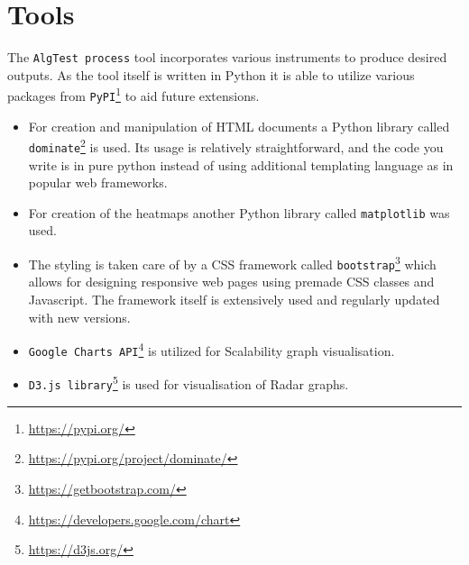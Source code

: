 \section{Tools}\label{sec:tools}
The \texttt{AlgTest process} tool incorporates various instruments to produce desired outputs. As the tool itself is written in Python it is able to utilize various packages from \texttt{PyPI}\footnote{\url{https://pypi.org/}} to aid future extensions.

\begin{itemize}
    \item For creation and manipulation of HTML documents a Python library called \texttt{dominate}\footnote{\url{https://pypi.org/project/dominate/}} is used. Its usage is relatively straightforward, and the code you write is in pure python instead of using additional templating language as in popular web frameworks.
    \item For creation of the heatmaps another Python library called \texttt{matplotlib} was used.
    \item The styling is taken care of by a CSS framework called \texttt{bootstrap}\footnote{\url{https://getbootstrap.com/}} which allows for designing responsive web pages using premade CSS classes and Javascript. The framework itself is extensively used and regularly updated with new versions.
    \item \texttt{Google Charts API}\footnote{\url{https://developers.google.com/chart}}  is utilized for Scalability graph visualisation.
    \item \texttt{D3.js library}\footnote{\url{https://d3js.org/}}  is used for visualisation of Radar graphs.
\end{itemize}

